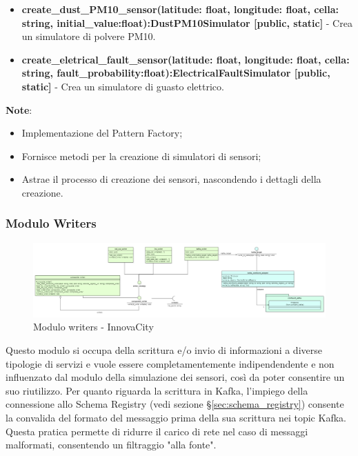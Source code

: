 \begin{itemize}
\begin{itemize}
\begin{itemize}
    \item \textbf{create\_dust\_PM10\_sensor(latitude: float, longitude: float, cella: string, initial\_value:float):DustPM10Simulator [public, static]} - Crea un simulatore di polvere PM10.
    \item \textbf{create\_eletrical\_fault\_sensor(latitude: float, longitude: float, cella: string, fault\_probability:float):ElectricalFaultSimulator [public, static]} - Crea un simulatore di guasto elettrico.
\end{itemize}
\textbf{Note}:
    \begin{itemize}
        \item Implementazione del Pattern Factory;
        \item Fornisce metodi per la creazione di simulatori di sensori;
        \item Astrae il processo di creazione dei sensori, nascondendo i dettagli della creazione.
    \end{itemize}
\end{itemize}
\end{itemize}

\subsubsection{Modulo Writers} \label{sec:writersModule}

\begin{figure}[H]
    \centering
    \includegraphics[width=1.1\textwidth]{../Images/SpecificaTecnica/writerModule.PNG}
    \caption{Modulo writers - InnovaCity}
    \label{fig: writersModule}
\end{figure}

Questo modulo si occupa della scrittura e/o invio di informazioni a diverse tipologie di servizi e vuole essere completamentemente indipendendente e non influenzato dal modulo della simulazione dei sensori, così da poter consentire un suo riutilizzo.
Per quanto riguarda la scrittura in Kafka, l'impiego della connessione allo Schema Registry (vedi sezione \S\ref{sec:schema_registry}) consente la convalida del formato del messaggio prima della sua scrittura nei topic Kafka. Questa pratica permette di ridurre il carico di rete nel caso di messaggi malformati, consentendo un filtraggio "alla fonte".

